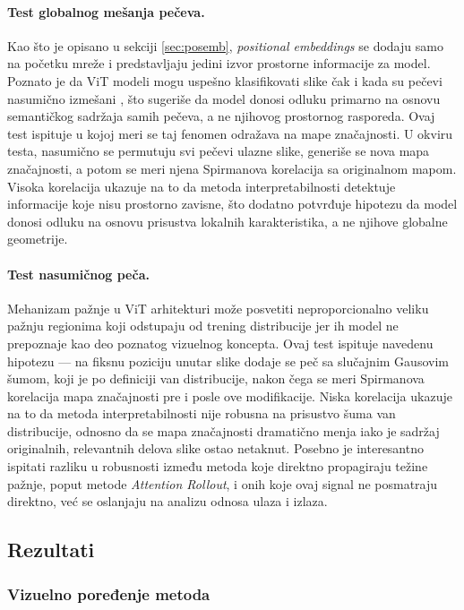 \paragraph{Test globalnog mešanja pečeva.} Kao što je opisano u sekciji \ref{sec:posemb}, 
\textit{positional embeddings} se dodaju samo na početku mreže i 
predstavljaju jedini izvor prostorne informacije za model. Poznato je da 
ViT modeli mogu uspešno klasifikovati slike čak i kada su pečevi 
nasumično izmešani \cite{dosovitskiy2021vit}, što sugeriše da model 
donosi odluku primarno na osnovu semantičkog sadržaja samih pečeva, a ne njihovog prostornog 
rasporeda. Ovaj test ispituje u kojoj meri se taj fenomen odražava na mape značajnosti. 
U okviru testa, nasumično se permutuju svi pečevi ulazne slike, generiše se nova mapa 
značajnosti, a potom se meri njena Spirmanova korelacija sa originalnom mapom. 
Visoka korelacija ukazuje na to da metoda interpretabilnosti detektuje 
informacije koje nisu prostorno zavisne, što dodatno potvrđuje hipotezu da model 
donosi odluku na osnovu prisustva lokalnih karakteristika, a ne njihove globalne geometrije.

\paragraph{Test nasumičnog peča.} Mehanizam pažnje u ViT arhitekturi može posvetiti 
neproporcionalno veliku pažnju regionima koji odstupaju od trening distribucije 
jer ih model ne prepoznaje kao deo poznatog vizuelnog koncepta. Ovaj 
test ispituje navedenu hipotezu — na fiksnu poziciju unutar slike dodaje se peč sa 
slučajnim Gausovim šumom, koji je po definiciji van distribucije, 
nakon čega se meri Spirmanova korelacija mapa značajnosti pre i posle ove modifikacije. 
Niska korelacija ukazuje na to da metoda interpretabilnosti nije robusna na prisustvo 
šuma van distribucije, odnosno da se mapa značajnosti dramatično menja iako je sadržaj 
originalnih, relevantnih delova slike ostao netaknut. Posebno je interesantno ispitati 
razliku u robusnosti između metoda koje direktno propagiraju težine pažnje, poput 
metode \textit{Attention Rollout}, i onih koje ovaj signal ne posmatraju direktno, već se 
oslanjaju na analizu odnosa ulaza i izlaza.

\subsection{Rezultati}

\subsubsection{Vizuelno poređenje metoda}

